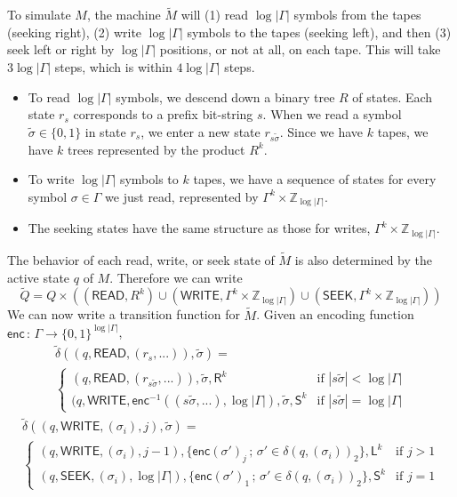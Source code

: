 \documentclass[12pt]{article}
\begin{document}
To simulate $M$, the machine $\tilde{M}$ will (1) read $\log|\Gamma|$ symbols from the tapes (seeking right), (2) write $\log|\Gamma|$ symbols to the tapes (seeking left), and then (3) seek left or right by $\log|\Gamma|$ positions, or not at all, on each tape. This will take $3\log|\Gamma|$ steps, which is within $4\log|\Gamma|$ steps. 
\begin{itemize}
\item{To read $\log|\Gamma|$ symbols, we descend down a binary tree $R$ of states. Each state $r_s$ corresponds to a prefix bit-string $s$. When we read a symbol $\tilde{\sigma} \in \{0,1\}$ in state $r_s$, we enter a new state $r_{s\tilde{\sigma}}$. Since we have $k$ tapes, we have $k$ trees represented by the product $R^k$.}
\item{To write $\log|\Gamma|$ symbols to $k$ tapes, we have a sequence of states for every symbol $\sigma \in \Gamma$ we just read, represented by $\Gamma^k \times \mathbb{Z}_{\log|\Gamma|}$.}
\item{The seeking states have the same structure as those for writes, $\Gamma^k \times \mathbb{Z}_{\log|\Gamma|}$.}
\end{itemize}
The behavior of each read, write, or seek state of $\tilde{M}$ is also determined by the active state $q$ of $M$. Therefore we can write
$$
\tilde{Q} = Q \times \left(
(\textsf{READ}, R^k) \cup
(\textsf{WRITE}, \Gamma^k \times \mathbb{Z}_{\log|\Gamma|}) \cup
(\textsf{SEEK}, \Gamma^k \times \mathbb{Z}_{\log|\Gamma|})
\right)
$$
We can now write a transition function for $\tilde{M}$. Given an encoding function $\textsf{enc} \,:\, \Gamma \rightarrow \{0,1\}^{\log|\Gamma|}$,
\begin{multline*}
\tilde{\delta}
((q, \textsf{READ}, (r_{s}, ...)), \tilde{\sigma}) = \\
\begin{cases}
(q, \textsf{READ}, (r_{s\tilde{\sigma}}, ...)), \tilde{\sigma}, \textsf{R}^k &
\text{if } |s\tilde{\sigma}| < \log|\Gamma| \\
(q, \textsf{WRITE}, \textsf{enc}^{-1}((s\tilde{\sigma}, ...), \log|\Gamma|), \tilde{\sigma}, \textsf{S}^k &
\text{if } |s\tilde{\sigma}| = \log|\Gamma|
\end{cases}
\end{multline*}
\begin{multline*}
\tilde{\delta}
((q, \textsf{WRITE}, (\sigma_i), j), \tilde{\sigma}) = \\
\begin{cases}
(q, \textsf{WRITE}, (\sigma_i), j-1), \{ \textsf{enc}(\sigma')_j \,;\, \sigma' \in \delta(q,(\sigma_i))_2 \}, \textsf{L}^k &
\text{if } j > 1 \\
(q, \textsf{SEEK}, (\sigma_i), \log|\Gamma|), \{ \textsf{enc}(\sigma')_1 \,;\, \sigma' \in \delta(q,(\sigma_i))_2 \}, \textsf{S}^k &
\text{if } j = 1
\end{cases}
\end{multline*}
\end{document}
